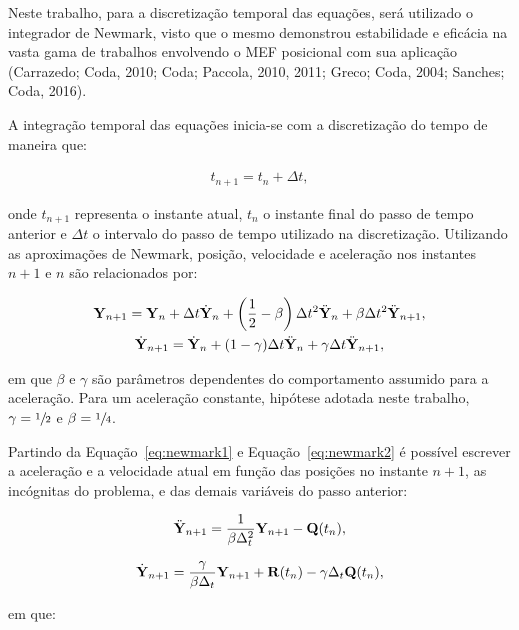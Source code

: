 Neste trabalho, para a discretização temporal das equações, será utilizado o integrador de Newmark, visto que o mesmo demonstrou estabilidade e eficácia na vasta gama de trabalhos envolvendo o MEF posicional com sua aplicação (Carrazedo; Coda, 2010;
Coda; Paccola, 2010, 2011; Greco; Coda, 2004; Sanches; Coda, 2016).

A integração temporal das equações inicia-se com a discretização do tempo de maneira que:

\begin{align}
	t_{n+1} = t_{n} + \Delta t, \label{eq:disc_tempo}
\end{align}

\noindent onde $t_{n+1}$ representa o instante atual, $t_{n}$ o instante final do passo de tempo anterior e  $\Delta t$ o intervalo do passo de tempo utilizado na discretização. Utilizando as aproximações de Newmark, posição, velocidade e aceleração nos instantes $n+1$ e $n$ são relacionados por:

\begin{gather}
	\mathbf{Y}_{n+1}=\mathbf{Y}_{n} + \Delta t \dot{\mathbf{Y}}_{n}+\left(\frac{1}{2}-\beta\right) \Delta t^2 \ddot{\mathbf{Y}}_{n}+ \beta \Delta t^2 \ddot{\mathbf{Y}}_{n+1},\label{eq:newmark1}\\
	\dot{\mathbf{Y}}_{n+1} = \dot{\mathbf{Y}}_{n}+(1-\gamma)\Delta t \ddot{\mathbf{Y}}_{n}+\gamma \Delta t \ddot{\mathbf{Y}}_{n+1},\label{eq:newmark2}
\end{gather}

\noindent em que $\beta$ e $\gamma$ são parâmetros dependentes do comportamento assumido para a aceleração. Para um aceleração constante, hipótese adotada neste trabalho, $\gamma=\sfrac{1}{2}$ e $\beta=\sfrac{1}{4}$.

Partindo da Equação~\eqref{eq:newmark1} e Equação~\eqref{eq:newmark2} é possível escrever a aceleração e a velocidade atual em função das posições no instante $n+1$, as incógnitas do problema, e das demais variáveis do passo anterior:

\begin{align}
	\ddot{\mathbf{Y}}_{n+1} = \frac{1}{\beta \Delta_{t}^2}\mathbf{Y}_{n+1} - \mathbf{Q}(t_n), \label{eq:accel_newmark}
\end{align}

\begin{align}
	\dot{\mathbf{Y}}_{n+1} = \frac{\gamma}{\beta \Delta_{t}}\mathbf{Y}_{n+1} + \mathbf{R}(t_n) - \gamma \Delta_{t} \mathbf{Q}(t_n), \label{eq:vel_newmark}
\end{align}

\noindent em que:

